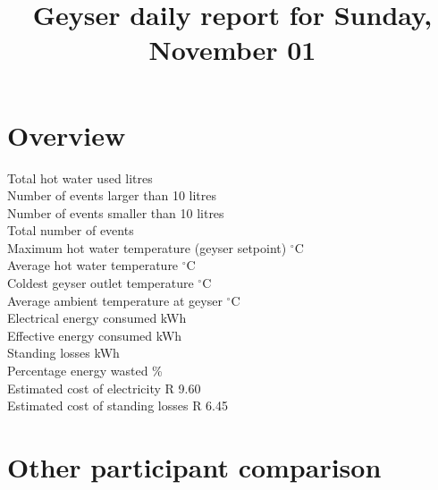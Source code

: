 \documentclass{article}\usepackage[]{graphicx}\usepackage[]{color}
\title{Geyser daily report for Sunday, November 01} %
\date{\vspace{-5ex}} %
\begin{document}
\maketitle %






\section{Overview}



Total hot water used  litres\\
Number of events larger than 10 litres \\
Number of events smaller than 10 litres \\
Total number of events \\

Maximum hot water temperature (geyser setpoint)  $^{\circ}$C\\
Average hot water temperature  $^{\circ}$C\\
Coldest geyser outlet temperature  $^{\circ}$C\\
Average ambient temperature at geyser  $^{\circ}$C\\

Electrical energy consumed  kWh\\
Effective energy consumed  kWh\\
Standing losses  kWh\\
Percentage energy wasted  \%\\
Estimated cost of electricity \dotfill  R 9.60\\
Estimated cost of standing losses \dotfill  R 6.45\\



\section{Other participant comparison}
\end{document}
